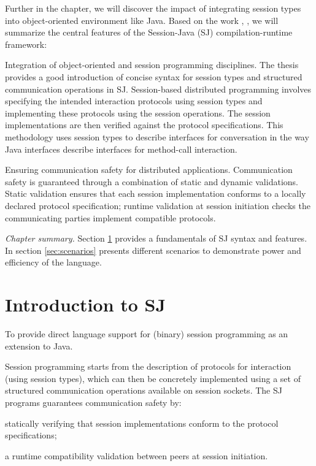 Further in the chapter, we will discover the impact of integrating session types into object-oriented environment like Java. Based on the work \cite{sessionbdpinjava}, \cite{sj-framework}, we will summarize the central features of the Session-Java (SJ) compilation-runtime framework:
\begin{compactenum}
\item  Integration of object-oriented and session programming disciplines. The thesis provides a good introduction of concise syntax for session types and structured communication operations in SJ. Session-based distributed programming involves specifying the intended interaction protocols using session types and implementing these protocols using the session operations. The session implementations are then verified against the protocol specifications. This methodology uses session types to describe interfaces for conversation in the way Java interfaces describe interfaces for method-call interaction.
\item Ensuring communication safety for distributed applications. Communication safety is guaranteed through a combination of static and dynamic validations. Static validation ensures that each session implementation conforms to a locally declared protocol specification; runtime validation at session initiation checks the communicating parties implement compatible protocols.
\end{compactenum}

\textit{Chapter summary.} Section \ref{sec:sj-intro} provides a fundamentals of SJ syntax and features. In section \ref{sec:scenarios} presents different scenarios to demonstrate power and efficiency of the language.

\section{Introduction to SJ}
\label{sec:sj-intro}

 To provide direct language support for (binary) session programming as an extension to Java.

Session programming starts from the description of protocols for interaction (using session types), which can then be concretely implemented using a set of structured communication operations available on session sockets. The SJ programs guarantees communication safety by:

\begin{compactenum}
\item  statically verifying that session implementations conform to the protocol specifications;

\item  a runtime compatibility validation between peers at session initiation.
\end{compactenum}

